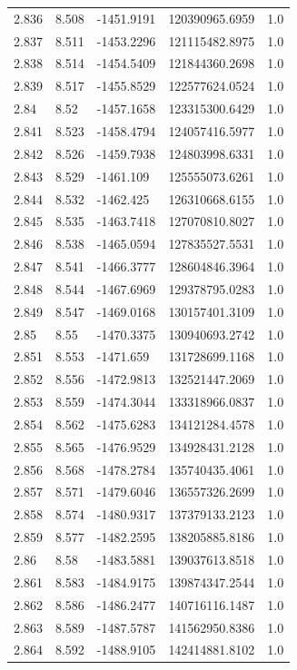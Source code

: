 \begin{tabular}{lllll}
2.836 & 8.508 & -1451.9191 & 120390965.6959 & 1.0 \\
2.837 & 8.511 & -1453.2296 & 121115482.8975 & 1.0 \\
2.838 & 8.514 & -1454.5409 & 121844360.2698 & 1.0 \\
2.839 & 8.517 & -1455.8529 & 122577624.0524 & 1.0 \\
2.84 & 8.52 & -1457.1658 & 123315300.6429 & 1.0 \\
2.841 & 8.523 & -1458.4794 & 124057416.5977 & 1.0 \\
2.842 & 8.526 & -1459.7938 & 124803998.6331 & 1.0 \\
2.843 & 8.529 & -1461.109 & 125555073.6261 & 1.0 \\
2.844 & 8.532 & -1462.425 & 126310668.6155 & 1.0 \\
2.845 & 8.535 & -1463.7418 & 127070810.8027 & 1.0 \\
2.846 & 8.538 & -1465.0594 & 127835527.5531 & 1.0 \\
2.847 & 8.541 & -1466.3777 & 128604846.3964 & 1.0 \\
2.848 & 8.544 & -1467.6969 & 129378795.0283 & 1.0 \\
2.849 & 8.547 & -1469.0168 & 130157401.3109 & 1.0 \\
2.85 & 8.55 & -1470.3375 & 130940693.2742 & 1.0 \\
2.851 & 8.553 & -1471.659 & 131728699.1168 & 1.0 \\
2.852 & 8.556 & -1472.9813 & 132521447.2069 & 1.0 \\
2.853 & 8.559 & -1474.3044 & 133318966.0837 & 1.0 \\
2.854 & 8.562 & -1475.6283 & 134121284.4578 & 1.0 \\
2.855 & 8.565 & -1476.9529 & 134928431.2128 & 1.0 \\
2.856 & 8.568 & -1478.2784 & 135740435.4061 & 1.0 \\
2.857 & 8.571 & -1479.6046 & 136557326.2699 & 1.0 \\
2.858 & 8.574 & -1480.9317 & 137379133.2123 & 1.0 \\
2.859 & 8.577 & -1482.2595 & 138205885.8186 & 1.0 \\
2.86 & 8.58 & -1483.5881 & 139037613.8518 & 1.0 \\
2.861 & 8.583 & -1484.9175 & 139874347.2544 & 1.0 \\
2.862 & 8.586 & -1486.2477 & 140716116.1487 & 1.0 \\
2.863 & 8.589 & -1487.5787 & 141562950.8386 & 1.0 \\
2.864 & 8.592 & -1488.9105 & 142414881.8102 & 1.0 \\

\end{tabular}
